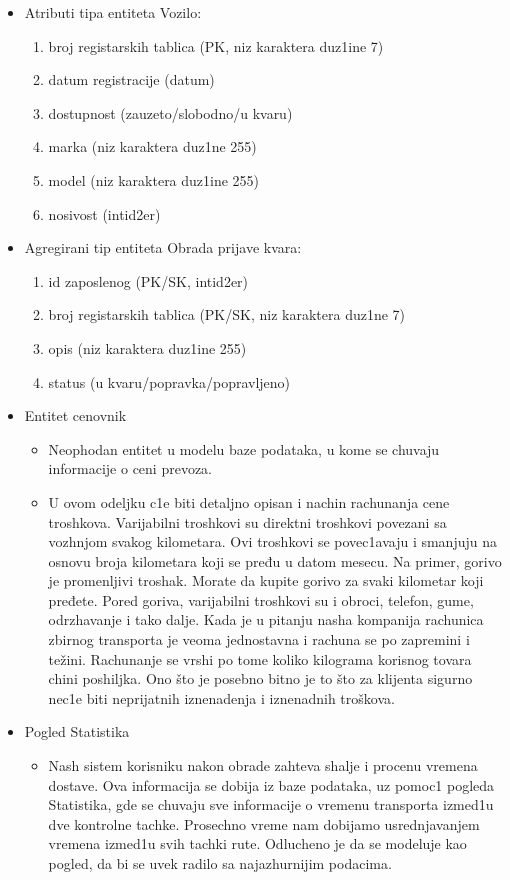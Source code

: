 \begin{itemize}
\begin{enumerate}
\end{enumerate}
\item
Atributi tipa entiteta Vozilo:
\begin{enumerate}
    \item {broj registarskih tablica (PK, niz karaktera duz1ine 7)}
    \item{datum registracije (datum)}
    \item{dostupnost (zauzeto/slobodno/u kvaru)}
    \item{marka (niz karaktera duz1ne 255)}
    \item{model (niz karaktera duz1ine 255)}
    \item{nosivost (intid2er)}
\end{enumerate}
\item
Agregirani tip entiteta Obrada prijave kvara:
\begin{enumerate}
    \item {id zaposlenog (PK/SK, intid2er)}
    \item{broj registarskih tablica (PK/SK, niz karaktera duz1ne 7)}
    \item{opis (niz karaktera duz1ine 255)}
    \item{status (u kvaru/popravka/popravljeno)}
\end{enumerate}

\item Entitet cenovnik
    \begin{itemize}
        \item Neophodan entitet u modelu baze podataka, u kome se chuvaju informacije o ceni prevoza.
        \item U ovom odeljku c1e biti detaljno opisan i nachin rachunanja cene troshkova. 
        Varijabilni troshkovi su direktni troshkovi povezani sa vozhnjom svakog kilometara. Ovi troshkovi se povec1avaju i smanjuju na osnovu broja kilometara koji se pređu u datom mesecu. Na primer, gorivo je promenljivi troshak. Morate da kupite gorivo za svaki kilometar koji pređete. Pored goriva, varijabilni troshkovi su i obroci, telefon, gume, odrzhavanje i tako dalje.
Kada je u pitanju nasha kompanija rachunica zbirnog transporta je veoma jednostavna i rachuna se po zapremini i težini.
Rachunanje se vrshi po tome koliko kilograma korisnog tovara chini poshiljka.  
Ono što je posebno bitno je to što za klijenta sigurno nec1e biti 
 neprijatnih iznenadenja i iznenadnih troškova. 
    \end{itemize}
\item Pogled Statistika
    \begin{itemize}
        \item Nash sistem korisniku nakon obrade zahteva shalje i procenu vremena dostave. Ova informacija se dobija iz baze podataka, uz pomoc1 pogleda Statistika, gde se chuvaju sve informacije o vremenu transporta izmed1u dve kontrolne tachke. Prosechno vreme nam dobijamo usrednjavanjem vremena izmed1u svih tachki rute.
        Odlucheno je da se modeluje kao pogled, da bi se uvek radilo sa najazhurnijim podacima.


\end{itemize}
\end{itemize}
